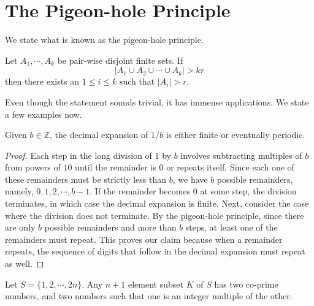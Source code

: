 \section{The Pigeon-hole Principle}
We state what is known as the pigeon-hole principle.
\begin{theorem}
Let $A_{1},\cdots,A_{k}$ be pair-wise disjoint finite sets. If \[|A_{1}\cup A_{2}\cup \cdots \cup A_{k}|>kr\] then there exists an $1\leq i\leq k$ such that $|A_{i}|>r$.
\end{theorem}
Even though the statement sounds trivial, it has immense applications. We state a few examples now. 
\begin{claim}
Given $b\in \mathbb{Z}$, the decimal expansion of $1/b$ is either finite or eventually periodic.
\end{claim}
\begin{proof}
Each step in the long division of $1$ by $b$ involves subtracting multiples of $b$ from powers of $10$ until the remainder is $0$ or repeats itself. Since each one of these remainders must be strictly less than $b$, we have $b$ possible remainders, namely, $0, 1, 2, \cdots, b-1$. If the remainder becomes $0$ at some step, the division terminates, in which case the decimal expansion is finite. Next, consider the case where the division does not terminate. By the pigeon-hole principle, since there are only $b$ possible remainders and more than $b$ steps, at least one of the remainders must repeat. This proves our claim because when a remainder repeats, the sequence of digits that follow in the decimal expansion must repeat as well.
\end{proof}
\begin{claim}
Let $S=\{1,2,\cdots,2n\}$. Any $n+1$ element subset $K$ of $S$ has two co-prime numbers, and two numbers such that one is an integer multiple of the other. 
\end{claim}
